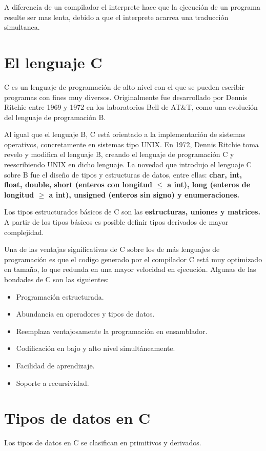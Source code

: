 \documentclass[]{article}
\begin{document}
A diferencia de un compilador el interprete hace que la ejecución de un programa resulte ser mas lenta, debido a que el interprete acarrea una traducción simultanea.

\section[Ventajas y desventajas]{El lenguaje C}
C es un lenguaje de programación de alto nivel con el que se pueden escribir programas con fines muy diversos. Originalmente fue desarrollado por Dennis Ritchie entre 1969 y 1972 en los laboratorios Bell de AT\&T, como una evolución del lenguaje de programación B.

Al igual que el lenguaje B, C está orientado a la implementación de sistemas operativos, concretamente en sistemas tipo UNIX. En 1972, Dennis Ritchie toma revelo y modifica el lenguaje B, creando el lenguaje de programación C y reescribiendo UNIX en dicho lenguaje. La novedad que introdujo el lenguaje C sobre B fue el diseño de tipos y estructuras de datos, entre ellas: \textbf{char, int, float, double, short (enteros con longitud $\leq$ a int), long (enteros de longitud $\geq$ a int), unsigned (enteros sin signo) y enumeraciones.}

Los tipos estructurados básicos de C son las \textbf{estructuras, uniones y matrices.} A partir de los tipos básicos es posible definir tipos derivados de mayor complejidad.

Una de las ventajas significativas de C sobre los de más lenguajes de programación es que el codigo generado por el compilador C está muy optimizado en tamaño, lo que redunda en una mayor velocidad en ejecución. Algunas de las bondades de C son las siguientes: 
\begin{itemize}
	\item Programación estructurada.
	\item Abundancia en operadores y tipos de datos.
	\item Reemplaza ventajosamente la programación en ensamblador.
	\item Codificación en bajo y alto nivel simultáneamente.
	\item Facilidad de aprendizaje.
	\item Soporte a recursividad.
\end{itemize}

\section{Tipos de datos en C}
Los tipos de datos en C se clasifican en primitivos y derivados.
\end{document}
